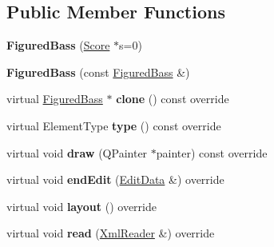 \subsection*{Public Member Functions}
\begin{DoxyCompactItemize}
\item 
\mbox{\label{class_ms_1_1_figured_bass_aad58d1dd297d1e37993927bb2bfd8bfc}} 
{\bfseries Figured\+Bass} (\hyperlink{class_ms_1_1_score}{Score} $\ast$s=0)
\item 
\mbox{\label{class_ms_1_1_figured_bass_a6f758db97999132553a9efe3f9c2ed8f}} 
{\bfseries Figured\+Bass} (const \hyperlink{class_ms_1_1_figured_bass}{Figured\+Bass} \&)
\item 
\mbox{\label{class_ms_1_1_figured_bass_a5a4879e4637e48bd2560933475fd2f21}} 
virtual \hyperlink{class_ms_1_1_figured_bass}{Figured\+Bass} $\ast$ {\bfseries clone} () const override
\item 
\mbox{\label{class_ms_1_1_figured_bass_ab9badd4cd0bdde1156a5d00ada9070d5}} 
virtual Element\+Type {\bfseries type} () const override
\item 
\mbox{\label{class_ms_1_1_figured_bass_aa56e2bc60f19849a953f79e2bbf918fc}} 
virtual void {\bfseries draw} (Q\+Painter $\ast$painter) const override
\item 
\mbox{\label{class_ms_1_1_figured_bass_ae8667a33759a863eb299d4c5bb549ddc}} 
virtual void {\bfseries end\+Edit} (\hyperlink{class_ms_1_1_edit_data}{Edit\+Data} \&) override
\item 
\mbox{\label{class_ms_1_1_figured_bass_a5a6b154d0bd82e23a10dbabd1291875e}} 
virtual void {\bfseries layout} () override
\item 
\mbox{\label{class_ms_1_1_figured_bass_af277d77b614dee2d1eb40168e8439aae}} 
virtual void {\bfseries read} (\hyperlink{class_ms_1_1_xml_reader}{Xml\+Reader} \&) override
\item 
\mbox{\label{class_ms_1_1_figured_bass_aa86312b2c8c8790ff05fa5ecd14e9063}} 

\end{DoxyCompactItemize}
